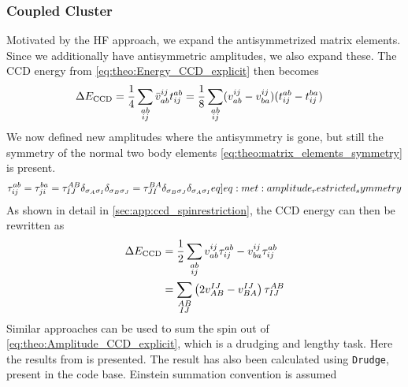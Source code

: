 \subsubsection{Coupled Cluster}
Motivated by the HF approach, we expand the antisymmetrized matrix elements. Since we additionally have antisymmetric amplitudes, we also expand these. The CCD energy from \cref{eq:theo:Energy_CCD_explicit} then becomes 
\begin{align*}
    \Delta E_{\text{CCD}}  &= \frac{1}{4} \sum_{\substack{ab\\ij}} \bar{v}^{ij}_{ab}t^{ab}_{ij} = \frac{1}{8}\sum_{\substack{ab\\ij}} (v^{ij}_{ab} - v^{ij}_{ba})(t^{ab}_{ij}- t^{ba}_{ij})
\end{align*}
We now defined new amplitudes where the antisymmetry is gone, but still the symmetry of the normal two body elements \cref{eq:theo:matrix_elements_symmetry} is present.
\begin{align}
    \amplituderestrict{ab}{ij} = \amplituderestrict{ba}{ji} = \amplituderestrict{AB}{IJ}\delta_{\sigma_{A}\sigma_{I}}\delta_{\sigma_{B}\sigma_{J}} = \amplituderestrict{BA}{JI}\delta_{\sigma_{B}\sigma_{J}}\delta_{\sigma_{A}\sigma_{I}} \label[eq]{eq:met:amplitude_restricted_symmetry}
\end{align}
As shown in detail in \cref{sec:app:ccd_spinrestriction}, the CCD energy can then be rewritten as
\begin{align*}
    \Delta E_{\text{CCD}}  &= \frac{1}{2}\sum_{\substack{ab\\ij}} v^{ij}_{ab} \tau^{ab}_{ij} - v^{ij}_{ba} \tau^{ab}_{ij} \\
    &= \sum_{\substack{AB\\IJ}} \left(2 v^{IJ}_{AB} - v^{IJ}_{BA}\right) \tau^{AB}_{IJ}
\end{align*}
Similar approaches can be used to sum the spin out of \cref{eq:theo:Amplitude_CCD_explicit}, which is a drudging and lengthy task. Here the results from  \citep{shavitt_bartlett_2009} is presented. The result has also been calculated using \verb|Drudge|, present in the code base. Einstein summation convention is assumed

